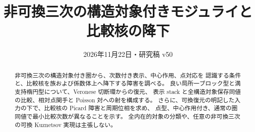 
\title{非可換三次の構造対象付きモジュライと比較核の降下}
\author{}
\date{2026年11月22日・研究稿 v50}

\maketitle
\begin{abstract}
非可換三次の構造対象付き圏から、次数付き表示、中心作用、点対応を
認識する条件と、比較核を族および係数体上へ降下する障害を調べる。
良い局所一ブロック型と満支持楕円型について、Veronese 切断環からの復元、
表示 stack と全構造対象保存同値の比較、相対点関手と Poisson 対への射を構成する。
さらに、可換復元の明記した入力の下で、比較核の Picard 障害と周期位相を求め、
点型、中心作用付き、通常の圏同値で最小比較次数が異なることを示す。
全内在的対象の分類や、任意の非可換三次の可換 Kuznetsov 実現は主張しない。
\end{abstract}
\setcounter{tocdepth}{1}
\tableofcontents







































